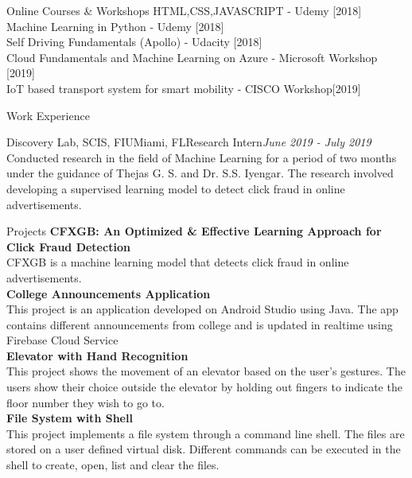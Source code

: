 \documentclass{resume} %
\begin{document}
\begin{rSection}{Online Courses \& Workshops}
HTML,CSS,JAVASCRIPT - Udemy [2018] \\
Machine Learning in Python - Udemy [2018] \\
Self Driving Fundamentals (Apollo) - Udacity [2018] \\
Cloud Fundamentals and Machine Learning on Azure - Microsoft Workshop [2019]\\
IoT based transport system for smart mobility - CISCO Workshop[2019]\\


\end{rSection}
\begin{rSection}{Work Experience}
\begin{rSubsection}{Discovery Lab, SCIS, FIU}{Miami, FL}{Research Intern}{\em June 2019 - July 2019}
Conducted research in the field of Machine Learning for a period of two months under the guidance of Thejas G. S. and Dr. S.S. Iyengar. The research involved developing a supervised learning model to detect click fraud in online advertisements. 
\end{rSubsection}

\end{rSection}

\begin{rSection}{Projects}
{\bf CFXGB: An Optimized \& Effective Learning Approach for Click Fraud Detection }
\\CFXGB is a machine learning model that detects click fraud in online advertisements. \\
{\bf College Announcements Application}\\
This project is an application developed on Android Studio using Java. The app contains different announcements from college and is updated in realtime using Firebase Cloud Service \\
{\bf Elevator with Hand Recognition}\\
This project shows the movement of an elevator based on the user's gestures. The users show their choice outside the elevator by holding out fingers to indicate the floor number they wish to go to.\\
{\bf File System with Shell}\\
This project implements a file system through a command line shell. The files are stored on a user defined virtual disk. Different commands can be executed in the shell to create, open, list and clear the files.
\end{rSection}
\end{document}
